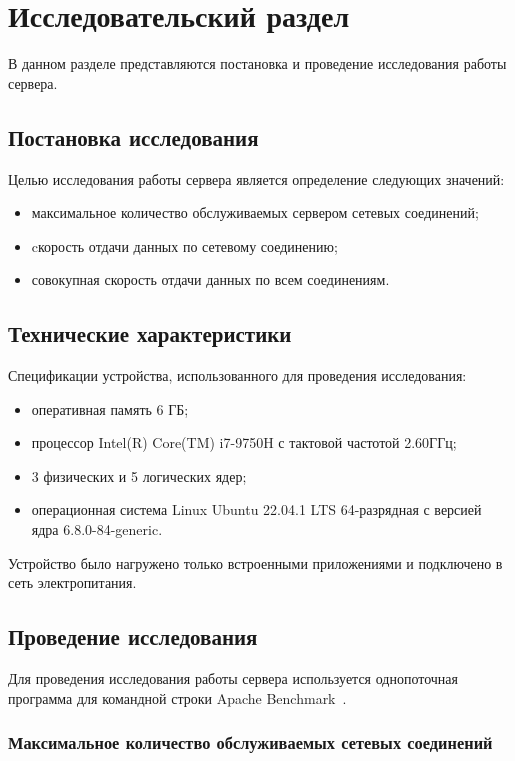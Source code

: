 \chapter{Исследовательский раздел}

В данном разделе представляются постановка и проведение исследования работы сервера.

\section{Постановка исследования}

Целью исследования работы сервера является определение следующих значений:
\begin{itemize}
	\item максимальное количество обслуживаемых сервером сетевых соединений;
	\item cкорость отдачи данных по сетевому соединению;
	\item совокупная скорость отдачи данных по всем соединениям.
\end{itemize}

\section{Технические характеристики}

Спецификации устройства, использованного для проведения исследования:
\begin{itemize}
	\item оперативная память 6 ГБ;
	\item процессор Intel(R) Core(TM) i7-9750H с тактовой частотой 2.60ГГц;
	\item 3 физических и 5 логических ядер;
	\item операционная система Linux Ubuntu 22.04.1 LTS 64-разрядная с версией ядра 6.8.0-84-generic.
\end{itemize}

Устройство было нагружено только встроенными приложениями и подключено в сеть электропитания.

\section{Проведение исследования}

Для проведения исследования работы сервера используется однопоточная программа для командной строки Apache Benchmark~\cite{apache-benchmark}. 

\subsection{Максимальное количество обслуживаемых сетевых соединений}

